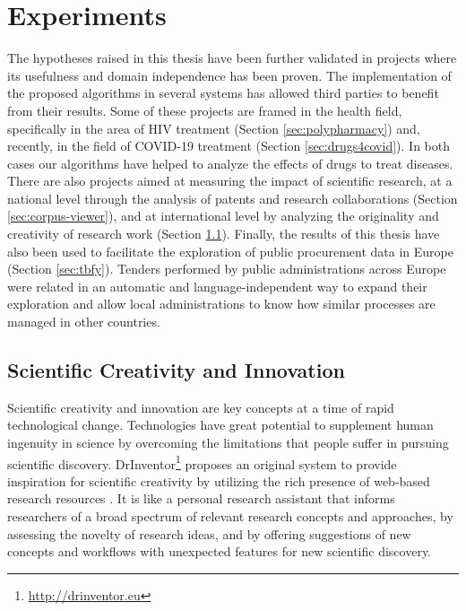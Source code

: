 

\chapter{Experiments}\label{ch:experiments}

\graphicspath{{experiments/figures/}}


The hypotheses raised in this thesis have been further validated in projects where its usefulness and domain independence has been proven. The implementation of the proposed algorithms in several systems  has allowed third parties to benefit from their results. Some of these projects are framed in the health field, specifically in the area of HIV treatment (Section \ref{sec:polypharmacy}) and, recently, in the field of COVID-19 treatment (Section \ref{sec:drugs4covid}). In both cases our algorithms have helped to analyze the effects of drugs to treat diseases. There are also projects aimed at measuring the impact of scientific research, at a national level through the analysis of patents and research collaborations (Section \ref{sec:corpus-viewer}), and at international level by analyzing the originality and creativity of research work (Section \ref{sec:drinventor}). Finally, the results of this thesis have also been used to facilitate the exploration of public procurement data in Europe (Section \ref{sec:tbfy}). Tenders performed by public administrations across Europe were related in an automatic and language-independent way to expand their exploration and allow local administrations to know how similar processes are managed in other countries.  

\section{Scientific Creativity and Innovation}
\label{sec:drinventor}

Scientific creativity and innovation are key concepts at a time of rapid technological change. Technologies have great potential to supplement human ingenuity in science by overcoming the limitations that people suffer in pursuing scientific discovery. DrInventor\footnote{\url{http://drinventor.eu}} proposes an original system to provide inspiration for scientific creativity by utilizing the rich presence of web-based research resources \citep{Dong2017DrIP}. It is like a personal research assistant that informs researchers of a broad spectrum of relevant research concepts and approaches, by assessing the novelty of research ideas, and by offering suggestions of new concepts and workflows with unexpected features for new scientific discovery.

